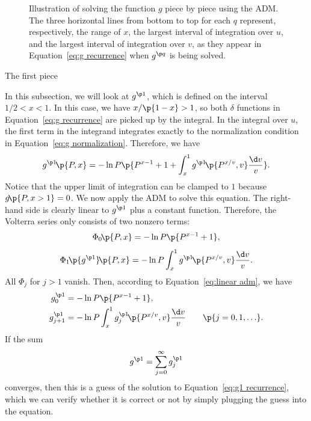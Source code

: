 \documentclass[oneside,12pt,final]{ucthesis-CA2012}
\newcommand{\dlt}{\delta}
\newcommand{\fr}{\frac}
\newcommand{\fc}[2]{#1\mathchoice{\!}{\!}{}{}\p{#2}} %
\begin{document}
\begin{mainmatter}
\begin{figure}[h!]
	\centering
	\caption{Illustration of solving the function $g$ piece by piece using the ADM.
	The three horizontal lines from bottom to top for each $q$
	represent, respectively,
	the range of $x$, the largest interval of integration over $u$,
	and the largest interval of integration over $v$,
	as they appear in Equation~\ref{eq:g recurrence} when $g^{\p q}$ is being solved.}
	\label{fig:g adm}
\end{figure}

\begin{section}{The first piece}
\label{sec:g1}

In this subsection, we will look at $g^{\p1}$, which is defined on the interval $1/2<x<1$.
In this case, we have $x/\p{1-x}>1$, so both $\dlt$ functions in Equation~\ref{eq:g recurrence}
are picked up by the integral.
In the integral over $u$, the first term in the integrand integrates exactly to the normalization condition
in Equation~\ref{eq:g normalization}.
Therefore, we have
\begin{equation}
	\label{eq:g1 recurrence}
	\fc{g^{\p1}}{P,x}=-\ln P\p{P^{x-1}+1+\int_x^1\fc{g^{\p1}}{P^{x/v},v}\fr{\d v}v}.
\end{equation}
Notice that the upper limit of integration can be clamped to $1$ because $\fc g{P,x>1}=0$.
We now apply the ADM to solve this equation.
The right-hand side is clearly linear to $g^{\p1}$ plus a constant function.
Therefore, the Volterra series only consists of two nonzero terms:
\[\fc{\Phi_0}{P,x}=-\ln P\p{P^{x-1}+1},\]
\[\fc{\fc{\Phi_1}{g^{\p1}}}{P,x}=-\ln P\int_x^1\fc{g^{\p1}}{P^{x/v},v}\fr{\d v}v.\]
All $\Phi_j$ for $j>1$ vanish.
Then, according to Equation~\ref{eq:linear adm}, we have
\begin{align*}
	g^{\p1}_0&=-\ln P\p{P^{x-1}+1},\\
	g^{\p1}_{j+1}&=-\ln P\int_x^1\fc{g^{\p1}_j}{P^{x/v},v}\fr{\d v}v\qquad\p{j=0,1,\ldots}.
\end{align*}
If the sum
\[g^{\p1}=\sum_{j=0}^\infty g^{\p1}_j\]
converges, then this is a guess of the solution to Equation~\ref{eq:g1 recurrence},
which we can verify whether it is correct or not by simply plugging the guess into the equation.


\end{section}
\end{mainmatter}
\end{document}

